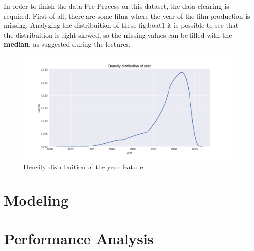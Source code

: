 \documentclass[../main]{subfiles}
\begin{document}
In order to finish the data Pre-Process on this dataset, the data cleaning is required. First of all, there are some films where the year of the film production is missing.
Analyzing the distribuition of these \refname{fig:boat1} it is possible to see that the distribuition is right skewed, so the missing values can be filled with the \textbf{median}, as suggested during the lectures.
\begin{figure}[h]
    \includegraphics[width=\linewidth]{figures/original_year.png}
    \caption{Density distribuition of the year feature}
    \label{fig:boat1}
  \end{figure}
\section{Modeling}
\section{Performance Analysis}
\end{document}
